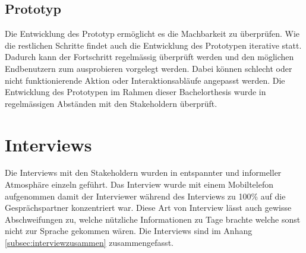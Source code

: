\subsection{Prototyp}
Die Entwicklung des Prototyp ermöglicht es die Machbarkeit zu überprüfen. Wie die restlichen Schritte findet auch die Entwicklung des Prototypen iterative statt. Dadurch kann der Fortschritt regelmässig überprüft werden und den möglichen Endbenutzern zum ausprobieren vorgelegt werden. Dabei können schlecht oder nicht funktionierende Aktion oder Interaktionsabläufe angepasst werden. Die Entwicklung des Prototypen im Rahmen dieser Bachelorthesis wurde in regelmässigen Abständen mit den Stakeholdern überprüft.


\section{Interviews}
\label{sec:interviews}

Die Interviews mit den Stakeholdern wurden in entspannter und informeller Atmosphäre einzeln geführt. Das Interview wurde mit einem Mobiltelefon aufgenommen damit der Interviewer während des Interviews zu 100\% auf die Gesprächspartner konzentriert war. Diese Art von Interview lässt auch gewisse Abschweifungen zu, welche nützliche Informationen zu Tage brachte welche sonst nicht zur Sprache gekommen wären. Die Interviews sind im Anhang \ref{subsec:interviewzusammen} zusammengefasst.